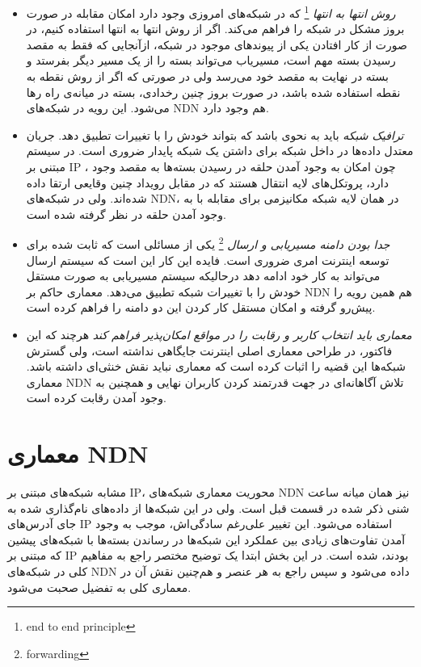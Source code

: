 \begin{itemize}
{}

\item{
\textit{روش انتها به انتها}
\footnote{end to end principle}
 \cite{end2end}
 که در شبکه‌های امروزی وجود دارد امکان مقابله در صورت بروز مشکل در شبکه  را فراهم می‌کند. اگر از روش انتها به انتها استفاده کنیم، در صورت از کار افتادن یکی از پیوندهای موجود در شبکه، از‌آنجایی که فقط به مقصد رسیدن بسته مهم است، مسیریاب می‌تواند بسته را از یک مسیر دیگر بفرستد و بسته در نهایت به مقصد خود می‌رسد ولی در صورتی که اگر از روش نقطه به نقطه استفاده شده باشد، در صورت بروز چنین رخدادی، بسته در میانه‌ی راه رها می‌شود. این رویه در شبکه‌های NDN هم وجود دارد. 
}

\item{
\textit{ترافیک شبکه}
باید به نحوی باشد که بتواند خودش را با تغییرات تطبیق دهد. جریان معتدل داده‌ها در داخل شبکه برای داشتن یک شبکه پایدار ضروری است. در سیستم مبتنی بر IP ، چون امکان به وجود آمدن حلقه در رسیدن بسته‌ها به مقصد وجود دارد، پروتکل‌های لایه انتقال هستند که در مقابل رویداد چنین وقایعی ارتقا داده شده‌اند. ولی در شبکه‌‌های NDN، در همان لایه شبکه مکانیزمی برای مقابله با به وجود آمدن حلقه در نظر گرفته شده است. 
}
\item{
\textit{جدا بودن دامنه مسیریابی و ارسال}
\footnote{forwarding}
یکی از مسائلی است که ثابت شده برای توسعه اینترنت امری ضروری است. فایده این کار این است که سیستم ارسال می‌تواند به کار خود ادامه دهد درحالیکه سیستم مسیریابی به صورت مستقل خودش را با تغییرات شبکه تطبیق می‌دهد.  معماری حاکم بر NDN هم همین رویه را پیش‌رو گرفته و امکان مستقل کار کردن این دو دامنه را فراهم کرده است. 
}

\item{
\textit{ معماری باید انتخاب کاربر و رقابت را در مواقع امکان‌پذیر فراهم کند }
هرچند که این فاکتور، در طراحی معماری اصلی اینترنت جایگاهی نداشته است، ولی گسترش شبکه‌ها این قضیه را اثبات کرده است که معماری نباید نقش خنثی‌ای داشته باشد. معماری NDN تلاش آگاهانه‌ای در جهت قدرتمند کردن کاربران نهایی و همچنین به وجود آمدن رقابت کرده است. 
\cite{clark2002tussle}
}

\end{itemize}

\section{معماری NDN}
مشابه شبکه‌های مبتنی بر IP، محوریت معماری شبکه‌های NDN  نیز همان میانه ساعت شنی ذکر شده در قسمت قبل است. ولی در این شبکه‌ها از داده‌‌های نام‌گذاری شده به جای آدرس‌های IP استفاده می‌‌شود. این تغییر علی‌رغم سادگی‌اش، موجب به وجود آمدن تفاوت‌های زیادی بین عملکرد این شبکه‌ها در رساندن بسته‌ها با شبکه‌های پیشین که مبتنی بر IP بودند، شده است.  در این بخش ابتدا یک توضیح مختصر راجع به مفاهیم کلی در شبکه‌های NDN داده می‌شود و سپس راجع به هر عنصر و هم‌چنین نقش آن در معماری کلی به تفضیل صحبت می‌شود. 

